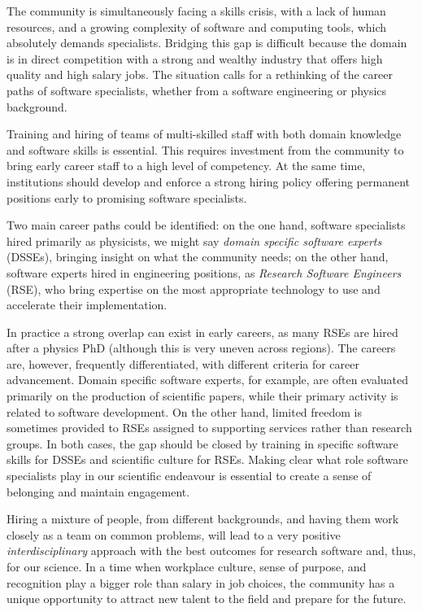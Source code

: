 The community is simultaneously facing a skills crisis, with a lack of human resources, and a growing complexity of software and computing tools, which absolutely demands specialists. Bridging this gap is difficult because the domain is in direct competition with a strong and wealthy industry that offers high quality and high salary jobs. The situation calls for a rethinking of the career paths of software specialists, whether from a software engineering or physics background.

Training and hiring of teams of multi-skilled staff with both domain knowledge and software skills is essential. This requires investment from the community to bring early career staff to a high level of competency. At the same time, institutions should develop and enforce a strong hiring policy offering permanent positions early to promising software specialists.

Two main career paths could be identified: on the one hand, software specialists hired primarily as physicists, we might say \emph{domain specific software experts} (DSSEs), bringing insight on what the community needs; on the other hand, software experts hired in engineering positions, as \emph{Research Software Engineers} (RSE), who bring expertise on the most appropriate technology to use and accelerate their implementation.

In practice a strong overlap can exist in early careers, as many RSEs are hired after a physics PhD (although this is very uneven across regions). The careers are, however, frequently differentiated, with different criteria for career advancement. Domain specific software experts, for example, are often evaluated primarily on the production of scientific papers, while their primary activity is related to software development. On the other hand, limited freedom is sometimes provided to RSEs assigned to supporting services rather than research groups. In both cases, the gap should be closed by training in specific software skills for DSSEs and scientific culture for RSEs. Making clear what role software specialists play in our scientific endeavour is essential to create a sense of belonging and maintain engagement.

Hiring a mixture of people, from different backgrounds, and having them work closely as a team on common problems, will lead to a very positive \emph{interdisciplinary} approach with the best outcomes for research software and, thus, for our science. In a time when workplace culture, sense of purpose, and recognition play a bigger role than salary in job choices, the community has a unique opportunity to attract new talent to the field and prepare for the future.

